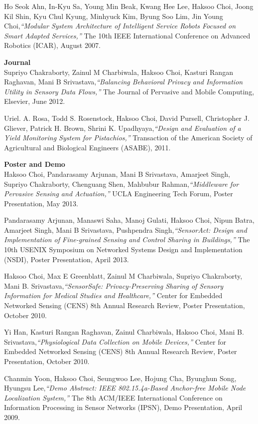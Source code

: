 \documentclass[12pt,letterpaper]{article}
\begin{document}
\bigskip
Ho Seok Ahn, In-Kyu Sa, Young Min Beak, Kwang Hee Lee, Haksoo Choi, Joong Kil Shin, Kyu Chul Kyung, Minhyuck Kim, Byung Soo Lim, Jin Young Choi,\emph{``Modular System Architecture of Intelligent Service Robots Focused on Smart Adapted Services,''} The 10th IEEE International Conference on Advanced Robotics (ICAR), August 2007.

\medskip
\textbf{Journal}\\
Supriyo Chakraborty, Zainul M Charbiwala, Haksoo Choi, Kasturi Rangan Raghavan, Mani B Srivastava,\emph{``Balancing Behavioral Privacy and Information Utility in Sensory Data Flows,''} The Journal of Pervasive and Mobile Computing, Elsevier, June 2012.

\bigskip
Uriel. A. Rosa, Todd S. Rosenstock, Haksoo Choi, David Pursell, Christopher J. Gliever, Patrick H. Brown, Shrini K. Upadhyaya,\emph{``Design and Evaluation of a Yield Monitoring System for Pistachios,''} Transaction of the American Society of Agricultural and Biological Engineers (ASABE), 2011.

\medskip
\textbf{Poster and Demo}\\
Haksoo Choi, Pandarasamy Arjunan, Mani B Srivastava, Amarjeet Singh, Supriyo Chakraborty, Chenguang Shen, Mahbubur Rahman,\emph{``Middleware for Pervasive Sensing and Actuation,''} UCLA Engineering Tech Forum, Poster Presentation, May 2013.

\bigskip
Pandarasamy Arjunan, Manaswi Saha, Manoj Gulati, Haksoo Choi, Nipun Batra, Amarjeet Singh, Mani B Srivastava, Pushpendra Singh,\emph{``SensorAct: Design and Implementation of Fine-grained Sensing and Control Sharing in Buildings,''} The 10th USENIX Symposium on Networked Systems Design and Implementation (NSDI), Poster Presentation, April 2013.

\bigskip
Haksoo Choi, Max E Greenblatt, Zainul M Charbiwala, Supriyo Chakraborty, Mani B. Srivastava,\emph{``SensorSafe: Privacy-Preserving Sharing of Sensory Information for Medical Studies and Healthcare,''} Center for Embedded Networked Sensing (CENS) 8th Annual Research Review, Poster Presentation, October 2010.

\bigskip
Yi Han, Kasturi Rangan Raghavan, Zainul Charbiwala, Haksoo Choi, Mani B. Srivastava,\emph{``Physiological Data Collection on Mobile Devices,''} Center for Embedded Networked Sensing (CENS) 8th Annual Research Review, Poster Presentation, October 2010.

\bigskip
Chanmin Yoon, Haksoo Choi, Seungwoo Lee, Hojung Cha, Byunghun Song, Hyungsu Lee,\emph{``Demo Abstract: IEEE 802.15.4a-Based Anchor-free Mobile Node Localization System,''} The 8th ACM/IEEE International Conference on Information Processing in Sensor Networks (IPSN), Demo Presentation, April 2009.
\end{document}
